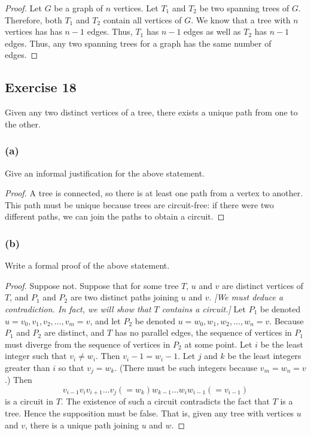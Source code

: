 \documentclass[14pt]{extarticle}
\begin{document}
\begin{proof}
Let \(G\) be a graph of \(n\) vertices. Let \(T_1\) and \(T_2\) be two spanning trees of \(G\). Therefore, both \(T_1\) 
and \(T_2\) contain all vertices of \(G\). We know that a tree with \(n\) vertices has has \(n-1\) edges. Thus, \(T_1\) has 
\(n-1\) edges as well as \(T_2\) has \(n-1\) edges. Thus, any two spanning trees for a graph has the same number of edges.
\end{proof}

\subsection{Exercise 18}
Given any two distinct vertices of a tree, there exists a unique path from one to the other.

\subsubsection{(a)}
Give an informal justification for the above statement.
\begin{proof}
A tree is connected, so there is at least one path from a vertex to another. This path must be unique because trees are
circuit-free: if there were two different paths, we can join the paths to obtain a circuit.
\end{proof}

\subsubsection{(b)}
Write a formal proof of the above statement.
\begin{proof}
Suppose not. Suppose that for some tree \(T\), \(u\) and \(v\) are distinct vertices of \(T\), and \(P_1\) and \(P_2\) are 
two distinct paths joining \(u\) and \(v\). {\it [We must deduce a contradiction. In fact, we will show that \(T\) 
contains a circuit.]} Let \(P_1\) be denoted \(u = v_0, v_1, v_2, \ldots, v_m = v\), and let \(P_2\) be denoted \(u = w_0, 
w_1, w_2, \ldots, w_n = v\). Because \(P_1\) and \(P_2\) are distinct, and \(T\) has no parallel edges, the sequence of 
vertices in \(P_1\) must diverge from the sequence of vertices in \(P_2\) at some point. Let \(i\) be the least integer such 
that \(v_i \neq w_i\). Then \(v_i - 1 = w_i - 1\). Let \(j\) and \(k\) be the least integers greater than \(i\) so that 
\(v_j = w_k\). (There must be such integers because \(v_m = w_n = v\).) Then 
\[
v_{i - 1}v_iv_{i+1} \ldots v_j(= w_k) w_{k - 1} \ldots w_iw_{i - 1} (= v_{i-1})
\] 
is a circuit in \(T\). The existence of such a circuit contradicts the fact that \(T\) is a tree. Hence the 
supposition must be false. That is, given any tree with vertices \(u\) and \(v\), there is a unique path joining 
\(u\) and \(w\).
\end{proof}
\end{document}
